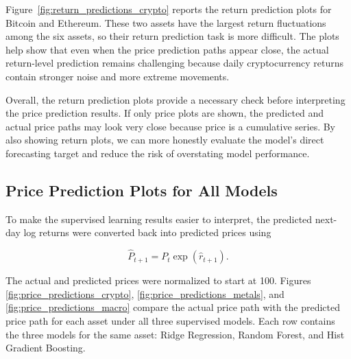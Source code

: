 \documentclass[12pt]{article}
\begin{document}
Figure~\ref{fig:return_predictions_crypto} reports the return prediction plots for Bitcoin and Ethereum. These two assets have the largest return fluctuations among the six assets, so their return prediction task is more difficult. The plots help show that even when the price prediction paths appear close, the actual return-level prediction remains challenging because daily cryptocurrency returns contain stronger noise and more extreme movements.

Overall, the return prediction plots provide a necessary check before interpreting the price prediction results. If only price plots are shown, the predicted and actual price paths may look very close because price is a cumulative series. By also showing return plots, we can more honestly evaluate the model's direct forecasting target and reduce the risk of overstating model performance.

\subsection{Price Prediction Plots for All Models}

To make the supervised learning results easier to interpret, the predicted next-day log returns were converted back into predicted prices using

\begin{equation}
\hat{P}_{t+1}
=
P_t \exp(\hat{r}_{t+1}).
\end{equation}

The actual and predicted prices were normalized to start at 100. Figures \ref{fig:price_predictions_crypto}, \ref{fig:price_predictions_metals}, and \ref{fig:price_predictions_macro} compare the actual price path with the predicted price path for each asset under all three supervised models. Each row contains the three models for the same asset: Ridge Regression, Random Forest, and Hist Gradient Boosting.

\end{document}
